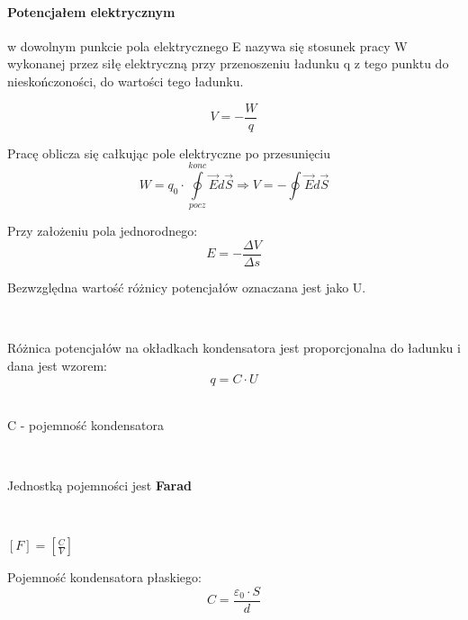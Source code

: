 \documentclass{article}
\begin{document}
            \paragraph{Potencjałem elektrycznym}
            w dowolnym punkcie pola elektrycznego E nazywa się
            stosunek pracy W wykonanej przez siłę elektryczną przy
            przenoszeniu ładunku q z tego punktu do nieskończoności,
            do wartości tego ładunku.

            \begin{equation}
                V = -\frac{W}{q}
            \end{equation}

            Pracę oblicza się całkując pole elektryczne po przesunięciu
            \begin{equation}
                W = q_0 \cdotp \oint\limits_{pocz}^{konc} {\vec{E}
                d\vec{S}}
                \Longrightarrow
                V = -\oint\nolimits_{} \vec E d\vec S
            \end{equation}

            Przy założeniu pola jednorodnego:
            \begin{equation}
                E = - \frac{\Delta V}{\Delta s}
            \end{equation}
            
            Bezwzględna wartość różnicy potencjałów oznaczana jest
            jako U.

            \
            
            Różnica potencjałów na okładkach kondensatora jest 
            proporcjonalna do ładunku i dana jest wzorem:
            \begin{equation}
                q = C \cdotp U
            \end{equation}
            \
            
            C - pojemność kondensatora
            
            \
            
            Jednostką pojemności jest \textbf{Farad}

            \
            
            $[F] = [\frac{C}{V}]$

            Pojemność kondensatora płaskiego:
            \begin{equation}
                C = \frac{\varepsilon_0 \cdotp S}{d}
            \end{equation}
\end{document}
